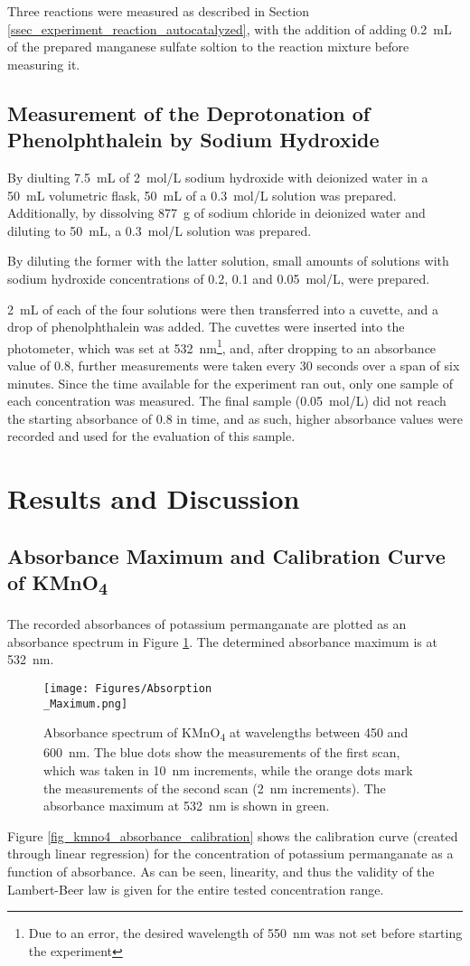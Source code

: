 \documentclass[titlepage]{article}
\begin{document}
Three reactions were measured as described in Section \ref{ssec_experiment_reaction_autocatalyzed}, with the addition of adding 0.2~mL of the prepared manganese sulfate soltion to the reaction mixture before measuring it.

\subsection{Measurement of the Deprotonation of Phenolphthalein by Sodium Hydroxide}
By diulting 7.5~mL of 2~mol/L sodium hydroxide with deionized water in a 50~mL volumetric flask, 50~mL of a 0.3~mol/L solution was prepared. Additionally, by dissolving 877~g of sodium chloride in deionized water and diluting to 50~mL, a 0.3~mol/L solution was prepared.

By diluting the former with the latter solution, small amounts of solutions with sodium hydroxide concentrations of 0.2, 0.1 and 0.05~mol/L, were prepared.

2~mL of each of the four solutions were then transferred into a cuvette, and a drop of phenolphthalein was added. The cuvettes were inserted into the photometer, which was set at 532~nm\footnote{Due to an error, the desired wavelength of 550~nm was not set before starting the experiment}, and, after dropping to an absorbance value of 0.8, further measurements were taken every 30 seconds over a span of six minutes. Since the time available for the experiment ran out, only one sample of each concentration was measured. The final sample (0.05~mol/L) did not reach the starting absorbance of 0.8 in time, and as such, higher absorbance values were recorded and used for the evaluation of this sample.

\newpage
\section{Results and Discussion}
\subsection{Absorbance Maximum and Calibration Curve of KMnO\texorpdfstring{\textsubscript{4}}{4}}
The recorded absorbances of potassium permanganate are plotted as an absorbance spectrum in Figure \ref{fig_kmno4_absorbance_spectrum}. The determined absorbance maximum is at 532~nm.
%
\begin{figure}[H]
    \centering
    \texttt{[image: Figures/Absorption\\\_Maximum.png]}
    \caption{Absorbance spectrum of KMnO\textsubscript{4} at wavelengths between 450 and 600~nm. The blue dots show the measurements of the first scan, which was taken in 10~nm increments, while the orange dots mark the measurements of the second scan (2~nm increments). The absorbance maximum at 532~nm is shown in green.}
    \label{fig_kmno4_absorbance_spectrum}
\end{figure}
%
\noindent Figure \ref{fig_kmno4_absorbance_calibration} shows the calibration curve (created through linear regression) for the concentration of potassium permanganate as a function of absorbance. As can be seen, linearity, and thus the validity of the Lambert-Beer law is given for the entire tested concentration range.
\end{document}
